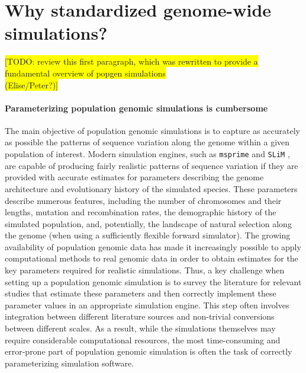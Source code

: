 \documentclass[hidelinks]{article}
\begin{document}


\hypertarget{sec2}{%
	\section*{Why standardized genome-wide simulations?}\label{sec:std-sim}}



%

\colorbox{yellow}{[TODO:  review this first paragraph, which was rewritten to
	provide a fundamental overview of popgen simulations}\\
\colorbox{yellow}{ (Elise/Peter?)]}

\paragraph*{Parameterizing population genomic simulations is cumbersome}
The main objective of population genomic simulations is to capture as accurately as possible
the patterns of sequence variation along the genome within a given population of interest.
Modern simulation engines, such as \texttt{msprime} \citep{Kelleher2016,Nelson2020}
and \texttt{SLiM} \citep{Haller2019}, are capable of producing fairly realistic patterns of sequence variation
if they are provided with accurate estimates for parameters describing the genome architecture
and evolutionary history of the simulated species.
These parameters describe numerous features, including the number of chromosomes and their lengths,
mutation and recombination rates, the demographic history of the simulated population,
and, potentially, the landscape of natural selection along the genome (when using a sufficiently flexible forward simulator).
The growing availability of population genomic data has made it increasingly possible
to apply computational methods to real genomic data in order to obtain estimates
for the key parameters required for realistic simulations.
Thus, a key challenge when setting up a population genomic simulation is to
survey the literature for relevant studies that estimate these parameters
and then correctly implement these parameter values in an appropriate simulation engine.
This step often involves integration between different literature sources and
non-trivial conversions between different scales.
As a result, while the simulations themselves may require considerable computational resources,
the most time-consuming and error-prone part of population genomic simulation is
often the task of correctly parameterizing simulation software.
\end{document}
